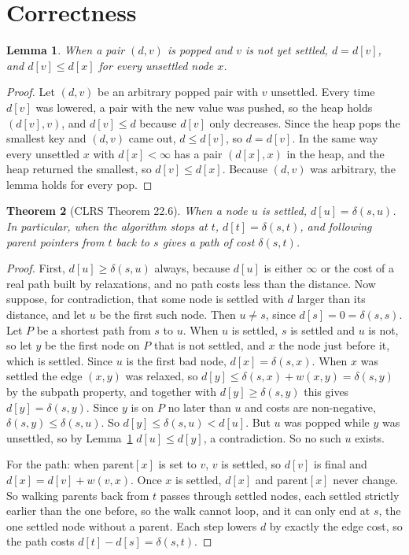 \documentclass[11pt]{article}
\newtheorem{theorem}{Theorem}
\newtheorem{lemma}[theorem]{Lemma}
\newcommand{\dist}{\delta}
\begin{document}
\section{Correctness}

\begin{lemma}\label{lem:lazy}
When a pair $(d,v)$ is popped and $v$ is not yet settled, $d=d[v]$, and $d[v]\le d[x]$ for every unsettled node $x$.
\end{lemma}
\begin{proof}
Let $(d,v)$ be an arbitrary popped pair with $v$ unsettled. Every time $d[v]$ was lowered, a pair with the new value was pushed, so the heap holds $(d[v],v)$, and $d[v]\le d$ because $d[v]$ only decreases. Since the heap pops the smallest key and $(d,v)$ came out, $d\le d[v]$, so $d=d[v]$. In the same way every unsettled $x$ with $d[x]<\infty$ has a pair $(d[x],x)$ in the heap, and the heap returned the smallest, so $d[v]\le d[x]$. Because $(d,v)$ was arbitrary, the lemma holds for every pop.
\end{proof}

\begin{theorem}[CLRS Theorem 22.6]\label{thm:dij}
When a node $u$ is settled, $d[u]=\dist(s,u)$. In particular, when the algorithm stops at $t$, $d[t]=\dist(s,t)$, and following parent pointers from $t$ back to $s$ gives a path of cost $\dist(s,t)$.
\end{theorem}
\begin{proof}
First, $d[u]\ge\dist(s,u)$ always, because $d[u]$ is either $\infty$ or the cost of a real path built by relaxations, and no path costs less than the distance. Now suppose, for contradiction, that some node is settled with $d$ larger than its distance, and let $u$ be the first such node. Then $u\neq s$, since $d[s]=0=\dist(s,s)$. Let $P$ be a shortest path from $s$ to $u$. When $u$ is settled, $s$ is settled and $u$ is not, so let $y$ be the first node on $P$ that is not settled, and $x$ the node just before it, which is settled. Since $u$ is the first bad node, $d[x]=\dist(s,x)$. When $x$ was settled the edge $(x,y)$ was relaxed, so $d[y]\le\dist(s,x)+w(x,y)=\dist(s,y)$ by the subpath property, and together with $d[y]\ge\dist(s,y)$ this gives $d[y]=\dist(s,y)$. Since $y$ is on $P$ no later than $u$ and costs are non-negative, $\dist(s,y)\le\dist(s,u)$. So $d[y]\le\dist(s,u)<d[u]$. But $u$ was popped while $y$ was unsettled, so by Lemma~\ref{lem:lazy} $d[u]\le d[y]$, a contradiction. So no such $u$ exists.

For the path: when $\mathrm{parent}[x]$ is set to $v$, $v$ is settled, so $d[v]$ is final and $d[x]=d[v]+w(v,x)$. Once $x$ is settled, $d[x]$ and $\mathrm{parent}[x]$ never change. So walking parents back from $t$ passes through settled nodes, each settled strictly earlier than the one before, so the walk cannot loop, and it can only end at $s$, the one settled node without a parent. Each step lowers $d$ by exactly the edge cost, so the path costs $d[t]-d[s]=\dist(s,t)$.
\end{proof}
\end{document}
